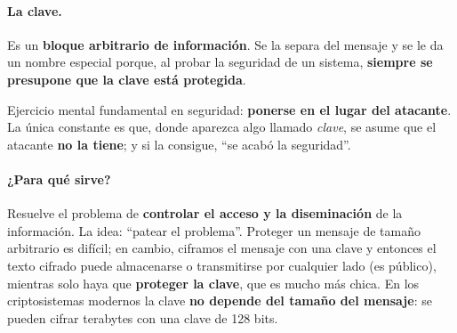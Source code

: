 \documentclass[../main.tex]{subfiles}
\begin{document}
\paragraph{La clave.} Es un \textbf{bloque arbitrario de información}. Se la
separa del mensaje y se le da un nombre especial porque, al probar la seguridad
de un sistema, \textbf{siempre se presupone que la clave está protegida}.

\begin{destacado}
Ejercicio mental fundamental en seguridad: \textbf{ponerse en el lugar del
atacante}. La única constante es que, donde aparezca algo llamado \emph{clave},
se asume que el atacante \textbf{no la tiene}; y si la consigue, ``se acabó la
seguridad''.
\end{destacado}

\paragraph{¿Para qué sirve?} Resuelve el problema de \textbf{controlar el acceso
y la diseminación} de la información. La idea: ``patear el problema''. Proteger
un mensaje de tamaño arbitrario es difícil; en cambio, ciframos el mensaje con
una clave y entonces el texto cifrado puede almacenarse o transmitirse por
cualquier lado (es público), mientras solo haya que \textbf{proteger la clave},
que es mucho más chica. En los criptosistemas modernos la clave \textbf{no
depende del tamaño del mensaje}: se pueden cifrar terabytes con una clave de
128 bits.
\end{document}
